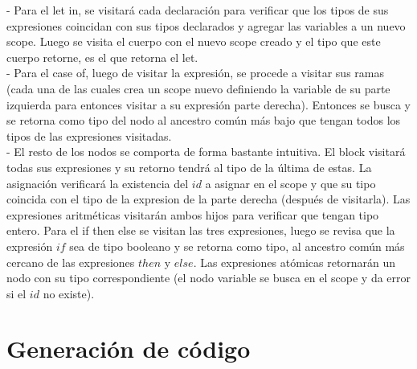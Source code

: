 \documentclass[a4paper,12pt]{article}
\begin{document}
- Para el let in, se visitará cada declaración para verificar que los tipos de sus expresiones coincidan con sus tipos declarados y agregar las variables a un nuevo scope. Luego se visita el cuerpo con el nuevo scope creado y el tipo que este cuerpo retorne, es el que retorna el let.\\

- Para el case of, luego de visitar la expresión, se procede a visitar sus ramas (cada una de las cuales crea un scope nuevo definiendo la variable de su parte izquierda para entonces visitar a su expresión parte derecha). Entonces se busca y se retorna como tipo del nodo al ancestro común más bajo que tengan todos los tipos de las expresiones visitadas.\\

- El resto de los nodos se comporta de forma bastante intuitiva. El block visitará todas sus expresiones y su retorno tendrá al tipo de la última de estas. La asignación verificará la existencia del $id$ a asignar en el scope y que su tipo coincida con el tipo de la expresion de la parte derecha (después de visitarla). Las expresiones aritméticas visitarán ambos hijos para verificar que tengan tipo entero. Para el if then else se visitan las tres expresiones, luego se revisa que la expresión $if$ sea de tipo booleano y se retorna como tipo, al ancestro común más cercano de las expresiones $then$ y $else$. Las expresiones atómicas retornarán un nodo con su tipo correspondiente (el nodo variable se busca en el scope y da error si el $id$ no existe).

\section*{Generación de código}
\end{document}
